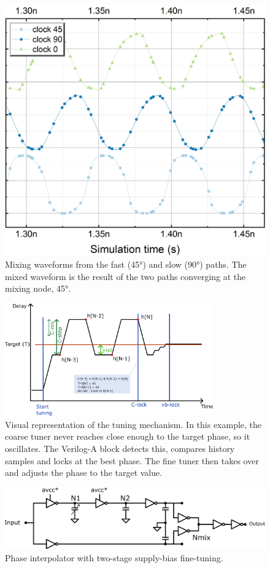 \begin{figure}[htbp]
  \centering
  \includegraphics[width=0.5\linewidth]{figures/Results/PI_8out_CSI-clock0Clock90MixingBuildingClock45.png}
  \caption{Mixing waveforms from the fast (\ang{45}) and slow (\ang{90}) paths. The mixed waveform is the result of the two paths converging at the mixing node, \ang{45}.}
  \label{fig:PI_1_mixing_waveforms}
\end{figure}

\begin{figure}[htbp]
  \centering
  \includegraphics[width=0.8\textwidth]{figures/Schematics/Tuning_principle.png}
  \caption{Visual representation of the tuning mechanism. In this example, the coarse tuner never reaches close enough to the target phase, so it oscillates. The Verilog-A block detects this, compares history samples and locks at the best phase. The fine tuner then takes over and adjusts the phase to the target value.}
  \label{fig:tuning_hierarchy}
\end{figure}

\begin{figure}[htbp]
  \centering
  \includegraphics[width=0.8\linewidth]{figures/Schematics/clock_generation_half_V2.png}
  \caption{Phase interpolator with two-stage supply-bias fine-tuning.}
  \label{fig:PI_2_schematic}
\end{figure}

